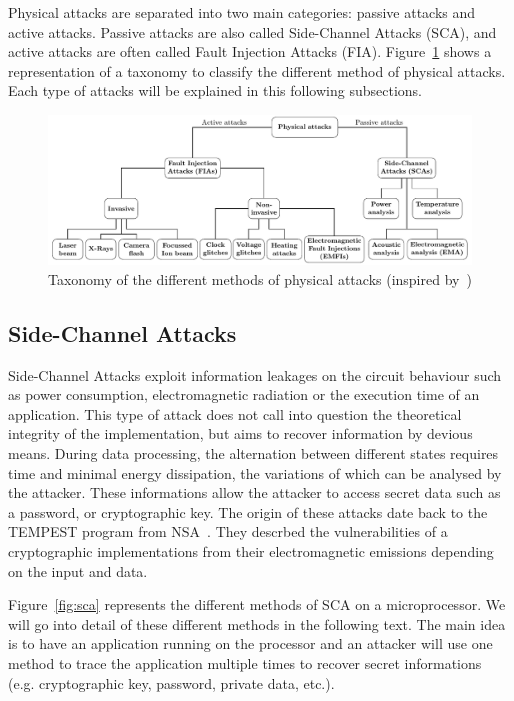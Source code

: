 Physical attacks are separated into two main categories: passive attacks and active attacks. Passive attacks are also called Side-Channel Attacks (SCA), and active attacks are often called Fault Injection Attacks (FIA). Figure~\ref{fig:arbo_fia} shows a representation of a taxonomy to classify the different method of physical attacks. Each type of attacks will be explained in this following subsections.

\begin{figure}[ht]
    \centering
    \includegraphics[width=\textwidth, page=1]{c2_soa/img/physicalAttacks.pdf}
    \caption{Taxonomy of the different methods of physical attacks (inspired by~\cite{CKNDCTD-21-compsec})}
    \label{fig:arbo_fia}
\end{figure}

\subsection{Side-Channel Attacks}
Side-Channel Attacks exploit information leakages on the circuit behaviour such as power consumption, electromagnetic radiation or the execution time of an application.
This type of attack does not call into question the theoretical integrity of the implementation, but aims to recover information by devious means. During data processing, the alternation between different states requires time and minimal energy dissipation, the variations of which can be analysed by the attacker.
These informations allow the attacker to access secret data such as a password, or cryptographic key. The origin of these attacks date back to the \mbox{TEMPEST} program from NSA~\cite{F-72-nsa}. They descrbed the vulnerabilities of a cryptographic implementations from their electromagnetic emissions depending on the input and data.

Figure~\ref{fig:sca} represents the different methods of SCA on a microprocessor. We will go into detail of these different methods in the following text. The main idea is to have an application running on the processor and an attacker will use one method to trace the application multiple times to recover secret informations (e.g. cryptographic key, password, private data, etc.).

